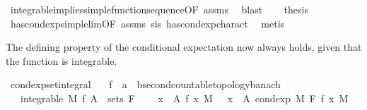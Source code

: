 \begin{isabellebody}
\ integrable{\isacharunderscore}{\kern0pt}implies{\isacharunderscore}{\kern0pt}simple{\isacharunderscore}{\kern0pt}function{\isacharunderscore}{\kern0pt}sequence{\isacharbrackleft}{\kern0pt}OF\ assms{\isacharbrackright}{\kern0pt}\ \isamarkupfalse%
\ blast\isanewline
\ \ \isamarkupfalse%
\ {\isacharquery}{\kern0pt}thesis\ \isamarkupfalse%
\ has{\isacharunderscore}{\kern0pt}cond{\isacharunderscore}{\kern0pt}exp{\isacharunderscore}{\kern0pt}simple{\isacharunderscore}{\kern0pt}lim{\isacharbrackleft}{\kern0pt}OF\ assms\ s{\isacharunderscore}{\kern0pt}is{\isacharbrackright}{\kern0pt}\ has{\isacharunderscore}{\kern0pt}cond{\isacharunderscore}{\kern0pt}exp{\isacharunderscore}{\kern0pt}charact{\isacharparenleft}{\kern0pt}{}{\isacharparenright}{\kern0pt}\ \isamarkupfalse%
\ metis\isanewline
{}\isamarkupfalse%
%
\endisatagproof
{\isafoldproof}%
%
\isadelimproof
%
\endisadelimproof
%
\isadelimdocument
%
\endisadelimdocument
%
\isatagdocument
%
\isamarkuptrue%
%
\endisatagdocument
{\isafolddocument}%
%
\isadelimdocument
%
\endisadelimdocument
%
\begin{isamarkuptext}%
The defining property of the conditional expectation now always holds, given that the function  is integrable.%
\end{isamarkuptext}\isamarkuptrue%
\isamarkupfalse%
\ cond{\isacharunderscore}{\kern0pt}exp{\isacharunderscore}{\kern0pt}set{\isacharunderscore}{\kern0pt}integral{\isacharcolon}{\kern0pt}\isanewline
\ \ \ f\ {\isacharcolon}{\kern0pt}{\isacharcolon}{\kern0pt}\ {\isachardoublequoteopen}{\isacharprime}{\kern0pt}a\ {\isasymRightarrow}\ {\isacharprime}{\kern0pt}b{\isacharcolon}{\kern0pt}{\isacharcolon}{\kern0pt}{\isacharbraceleft}{\kern0pt}second{\isacharunderscore}{\kern0pt}countable{\isacharunderscore}{\kern0pt}topology{\isacharcomma}{\kern0pt}banach{\isacharbraceright}{\kern0pt}{\isachardoublequoteclose}\isanewline
\ \ \ {\isachardoublequoteopen}integrable\ M\ f{\isachardoublequoteclose}\ {\isachardoublequoteopen}A\ {\isasymin}\ sets\ F{\isachardoublequoteclose}\isanewline
\ \ \ {\isachardoublequoteopen}{\isacharparenleft}{\kern0pt}{\isasymintegral}\ x\ {\isasymin}\ A{\isachardot}{\kern0pt}\ f\ x\ {\isasympartial}M{\isacharparenright}{\kern0pt}\ {\isacharequal}{\kern0pt}\ {\isacharparenleft}{\kern0pt}{\isasymintegral}\ x\ {\isasymin}\ A{\isachardot}{\kern0pt}\ cond{\isacharunderscore}{\kern0pt}exp\ M\ F\ f\ x\ {\isasympartial}M{\isacharparenright}{\kern0pt}{\isachardoublequoteclose}\isanewline

\end{isabellebody}
